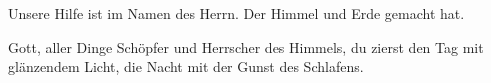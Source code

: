 \medskip



\resp


\medskip

\begin{sloppypar}
{\noindent\rm{ Unsere Hilfe ist im Namen des Herrn. Der Himmel und Erde gemacht hat.}}
\end{sloppypar}

\vspace{0.3cm}


\def\greinitialformat#1{{\fontsize{40}{40}\selectfont #1}}
\gresetfirstlineaboveinitial{\small \textcolor{red}{hieme}}{}
\setaboveinitialseparation{0.72mm}

\medskip

\begin{sloppypar}
{\noindent\rm{ Gott, aller Dinge Schöpfer und Herrscher des Himmels,
du zierst den Tag mit glänzendem Licht, die Nacht mit der Gunst des Schlafens.}}
\end{sloppypar}

\medskip

